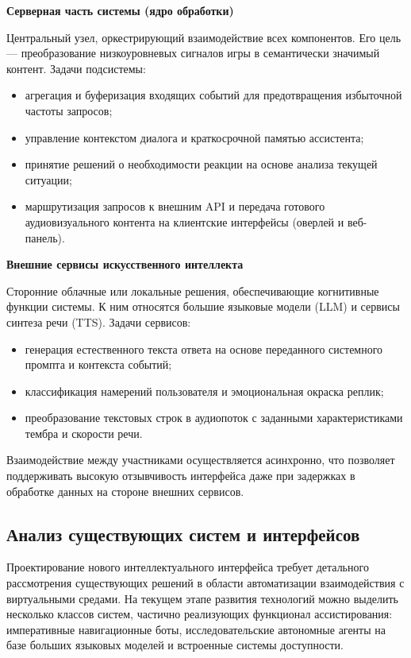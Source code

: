 \textbf{Серверная часть системы (ядро обработки)}

Центральный узел, оркестрирующий взаимодействие всех компонентов. Его цель — преобразование низкоуровневых сигналов игры в семантически значимый контент. Задачи подсистемы:
\begin{itemize}
    \item агрегация и буферизация входящих событий для предотвращения избыточной частоты запросов;
    \item управление контекстом диалога и краткосрочной памятью ассистента;
    \item принятие решений о необходимости реакции на основе анализа текущей ситуации;
    \item маршрутизация запросов к внешним API и передача готового аудиовизуального контента на клиентские интерфейсы (оверлей и веб-панель).
\end{itemize}

\textbf{Внешние сервисы искусственного интеллекта}

Сторонние облачные или локальные решения, обеспечивающие когнитивные функции системы. К ним относятся большие языковые модели (LLM) и сервисы синтеза речи (TTS). Задачи сервисов:
\begin{itemize}
    \item генерация естественного текста ответа на основе переданного системного промпта и контекста событий;
    \item классификация намерений пользователя и эмоциональная окраска реплик;
    \item преобразование текстовых строк в аудиопоток с заданными характеристиками тембра и скорости речи.
\end{itemize}

Взаимодействие между участниками осуществляется асинхронно, что позволяет поддерживать высокую отзывчивость интерфейса даже при задержках в обработке данных на стороне внешних сервисов.

\subsection{Анализ существующих систем и интерфейсов}
Проектирование нового интеллектуального интерфейса требует детального рассмотрения существующих решений в области автоматизации взаимодействия с виртуальными средами. На текущем этапе развития технологий можно выделить несколько классов систем, частично реализующих функционал ассистирования: императивные навигационные боты, исследовательские автономные агенты на базе больших языковых моделей и встроенные системы доступности.

